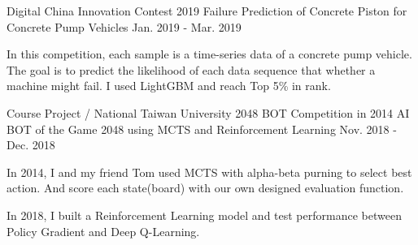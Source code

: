 \begin{cventries}
  \cventry
    {Digital China Innovation Contest 2019} %
    {Failure Prediction of Concrete Piston for Concrete Pump Vehicles} %
    {} %
    {Jan. 2019 - Mar. 2019} %
    {
      \begin{cvitems} %
        \item {In this competition, each sample is a time-series data of a concrete pump vehicle. The goal is to predict the likelihood of each data sequence that whether a machine might fail. I used LightGBM and reach Top 5\% in rank.}
      \end{cvitems}
    }

  \cventry
    {Course Project / National Taiwan University 2048 BOT Competition in 2014} %
    {AI BOT of the Game 2048 using MCTS and Reinforcement Learning} %
    {} %
    {Nov. 2018 - Dec. 2018} %
    {
      \begin{cvitems} %
        \item {In 2014, I and my friend Tom used MCTS with alpha-beta purning to select best action. And score each state(board) with our own designed evaluation function.}
        \item {In 2018, I built a Reinforcement Learning model and test performance between Policy Gradient and Deep Q-Learning.}
      \end{cvitems}
    }

\end{cventries}
